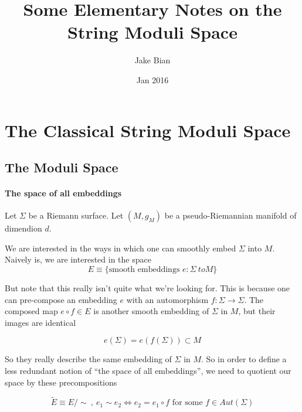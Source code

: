 \documentclass{article}
\title{Some Elementary Notes on the String Moduli Space}
\author{Jake Bian}
\date{Jan 2016}
\begin{document}
    \maketitle



    \section{The Classical String Moduli Space}

        \subsection{The Moduli Space}
        \paragraph{The space of all embeddings}

            Let $\Sigma$ be a Riemann surface. Let $(M, g_M)$ be a pseudo-Riemannian manifold of dimendion $d$.

            We are interested in the ways in which one can smoothly embed $\Sigma$ into $M$. Naively  is, we are interested in the space
            \begin{equation}
                E \equiv \{ \text{smooth embeddings } e: \Sigma \ to M \}
            \end{equation}

            But note that this really isn't quite what we're looking for. This is because one can pre-compose an embedding $e$ with an automorphism $f: \Sigma \to \Sigma$. The composed map $e \circ f \in E$ is another smooth embedding of $\Sigma$ in $M$, but their images are identical

            \begin{equation}
                e(\Sigma) = e(f(\Sigma)) \subset M
            \end{equation}

            So they really describe the same embedding of $\Sigma$ in $M$. So in order to define a less redundant notion of ``the space of all embeddings'', we need to quotient our space by these precompositions

            \begin{equation}
                \tilde E \equiv E/\sim ~,~ e_1 \sim e_2 \iff e_2 = e_1 \circ f \text{ for some } f \in Aut(\Sigma)
            \end{equation}
\end{document}
